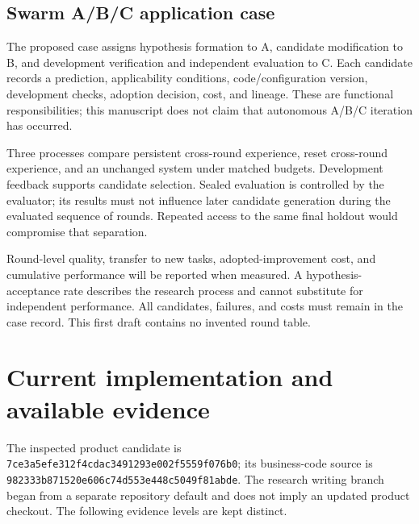 \documentclass[
  english,
  11pt,
]{article}
\begin{document}
\subsection{Swarm A/B/C application
case}\label{swarm-abc-application-case}

The proposed case assigns hypothesis formation to A, candidate
modification to B, and development verification and independent
evaluation to C. Each candidate records a prediction, applicability
conditions, code/configuration version, development checks, adoption
decision, cost, and lineage. These are functional responsibilities; this
manuscript does not claim that autonomous A/B/C iteration has occurred.

Three processes compare persistent cross-round experience, reset
cross-round experience, and an unchanged system under matched budgets.
Development feedback supports candidate selection. Sealed evaluation is
controlled by the evaluator; its results must not influence later
candidate generation during the evaluated sequence of rounds. Repeated
access to the same final holdout would compromise that separation.

Round-level quality, transfer to new tasks, adopted-improvement cost,
and cumulative performance will be reported when measured. A
hypothesis-acceptance rate describes the research process and cannot
substitute for independent performance. All candidates, failures, and
costs must remain in the case record. This first draft contains no
invented round table.

\section{Current implementation and available
evidence}\label{current-implementation-and-available-evidence}

The inspected product candidate is
\texttt{7ce3a5efe312f4cdac3491293e002f5559f076b0}; its business-code
source is \texttt{982333b871520e606c74d553e448c5049f81abde}. The
research writing branch began from a separate repository default and
does not imply an updated product checkout. The following evidence
levels are kept distinct.
\end{document}
